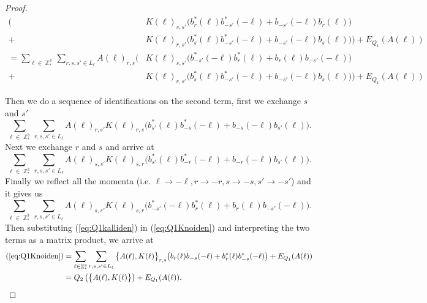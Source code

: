 \documentclass[sn-mathphys,Numbered, a4paper ,nocrop]{sn-jnl}%
\DeclareMathOperator{\Z}{\mathbb{Z}}
\theoremstyle{plain}
\theoremstyle{definition}
\theoremstyle{remark}
\theoremstyle{plain}
\theoremstyle{definition}
\theoremstyle{remark}
\begin{document}
\begin{proof}
\begin{align}
        \Big(&K(\ell)_{s,s'}\big(b^*_{r}(\ell)b^*_{-s'}(-\ell)+b_{-s'}(-\ell)b_{r}(\ell)\big)\nonumber\\ + &K(\ell)_{r,s'}\big(b^*_{s}(\ell)b^*_{-s'}(-\ell) +b_{-s'}(-\ell)b_{s}(\ell) \big)\Big) + E_{Q_1}(A(\ell))\\
        =\sum\limits_{\ell \in \Z^3_*}\sum\limits_{r,s,s' \in L_{\ell}}A(\ell)_{r,s}
        \Big(&K(\ell)_{s,s'}\big(b^*_{-s'}(-\ell)b^*_{r}(\ell)+b_{r}(\ell)b_{-s'}(-\ell)\big)\nonumber\\ + &K(\ell)_{r,s'}\big(b^*_{s}(\ell)b^*_{-s'}(-\ell) +b_{-s'}(-\ell)b_{s}(\ell) \big)\Big) + E_{Q_1}(A(\ell))\label{eq:Q1Knoiden}
\end{align}

Then we do a sequence of identifications on the second term, first we exchange $s$ and $s'$ 
\begin{equation}
    \sum\limits_{\ell \in \Z^3_*}\sum\limits_{r,s,s' \in L_{\ell}}A(\ell)_{r,s'}K(\ell)_{r,s}\big(b^*_{s'}(\ell)b^*_{-s}(-\ell)+b_{-s}(-\ell)b_{s'}(\ell) \big).
\end{equation}
Next we exchange $r$ and $s$ and arrive at
\begin{equation}
    \sum\limits_{\ell \in \Z^3_*}\sum\limits_{r,s,s' \in L_{\ell}}A(\ell)_{s,s'}K(\ell)_{s,r}\big(b^*_{s'}(\ell)b^*_{-r}(-\ell) +b_{-r}(-\ell)b_{s'}(\ell)\big).
\end{equation}
Finally we reflect all the momenta (i.e. $\ell\rightarrow -\ell,r\rightarrow -r,s\rightarrow -s,s'\rightarrow -s'$) and it gives us
\begin{equation}\label{eq:Q1kalliden}
    \sum\limits_{\ell \in \Z^3_*}\sum\limits_{r,s,s' \in L_{\ell}}A(\ell)_{s,s'}K(\ell)_{s,r}\big(b^*_{-s'}(-\ell)b^*_{r}(\ell) +b_{r}(\ell)b_{-s'}(-\ell)\big).
\end{equation}
Then substituting (\ref{eq:Q1kalliden}) in (\ref{eq:Q1Knoiden}) and interpreting the two terms as a matrix product, we arrive at
\begin{align}
    (\ref{eq:Q1Knoiden}) &= \sum\limits_{\ell \in \Z^3_*}\sum\limits_{r,s,s' \in L_{\ell}}\big\{A(\ell), K(\ell)\big\}_{r,s}\big(b_{r}(\ell)b_{-s}(-\ell)+b^*_{r}(\ell)b^*_{-s}(-\ell)  \big) + E_{Q_1}(A(\ell))\\
    &= Q_2\left(\big\{A(\ell), K(\ell)\big\}\right) + E_{Q_1}(A(\ell)).
\end{align}
\end{proof}
\end{document}
